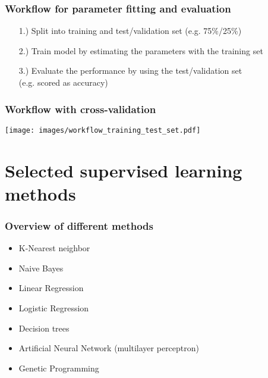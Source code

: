 \documentclass[aspectratio=169]{beamer}
\begin{document}
\begin{frame}
  \frametitle{Workflow for parameter fitting and evaluation}
  \begin{block}{}
    \begin{center}
      \begin{itemize}
      \item[1.)] Split into training and test/validation set (e.g. 75\%/25\%)
      \item[2.)] Train model by estimating the parameters with the training set
      \item[3.)] Evaluate the performance by using the test/validation
        set \\(e.g. scored as accuracy)
      \end{itemize}
    \end{center}    
  \end{block}
\end{frame}


\begin{frame}
  \frametitle{Workflow with cross-validation}
  \begin{center}
    \texttt{[image: images/workflow\_training\_test\_set.pdf]}
  \end{center}    
\end{frame}


\section{Selected supervised learning methods}

\begin{frame}{}
   \tableofcontents[currentsection]
\end{frame}

\begin{frame}
  \frametitle{Overview of different methods}
  \begin{block}{}
    \begin{center}
      \begin{itemize}
      \item K-Nearest neighbor
      \item Naive Bayes
      \item Linear Regression
      \item Logistic Regression
      \item Decision trees
      \item Artificial Neural Network (multilayer perceptron)
      \item Genetic Programming
      \end{itemize}
    \end{center}    
  \end{block}
\end{frame}
\end{document}
